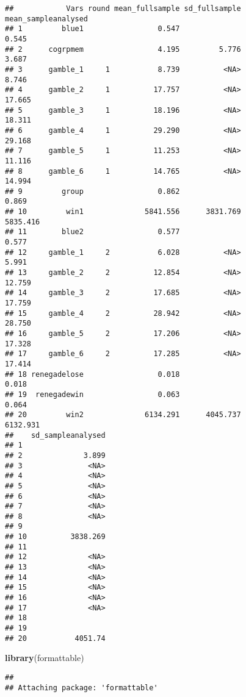 \documentclass[]{article}
\newenvironment{Shaded}{\begin{snugshade}}{\end{snugshade}}
\newcommand{\KeywordTok}[1]{\textcolor[rgb]{0.13,0.29,0.53}{\textbf{#1}}}
\newcommand{\NormalTok}[1]{#1}
\begin{document}
\begin{verbatim}
##            Vars round mean_fullsample sd_fullsample mean_sampleanalysed
## 1         blue1                 0.547                             0.545
## 2      cogrpmem                 4.195         5.776               3.687
## 3      gamble_1     1           8.739          <NA>               8.746
## 4      gamble_2     1          17.757          <NA>              17.665
## 5      gamble_3     1          18.196          <NA>              18.311
## 6      gamble_4     1          29.290          <NA>              29.168
## 7      gamble_5     1          11.253          <NA>              11.116
## 8      gamble_6     1          14.765          <NA>              14.994
## 9         group                 0.862                             0.869
## 10         win1              5841.556      3831.769            5835.416
## 11        blue2                 0.577                             0.577
## 12     gamble_1     2           6.028          <NA>               5.991
## 13     gamble_2     2          12.854          <NA>              12.759
## 14     gamble_3     2          17.685          <NA>              17.759
## 15     gamble_4     2          28.942          <NA>              28.750
## 16     gamble_5     2          17.206          <NA>              17.328
## 17     gamble_6     2          17.285          <NA>              17.414
## 18 renegadelose                 0.018                             0.018
## 19  renegadewin                 0.063                             0.064
## 20         win2              6134.291      4045.737            6132.931
##    sd_sampleanalysed
## 1                   
## 2              3.899
## 3               <NA>
## 4               <NA>
## 5               <NA>
## 6               <NA>
## 7               <NA>
## 8               <NA>
## 9                   
## 10          3838.269
## 11                  
## 12              <NA>
## 13              <NA>
## 14              <NA>
## 15              <NA>
## 16              <NA>
## 17              <NA>
## 18                  
## 19                  
## 20           4051.74
\end{verbatim}

\begin{Shaded}
\begin{Highlighting}[]
\KeywordTok{library}\NormalTok{(formattable)}
\end{Highlighting}
\end{Shaded}

\begin{verbatim}
## 
## Attaching package: 'formattable'
\end{verbatim}
\end{document}
